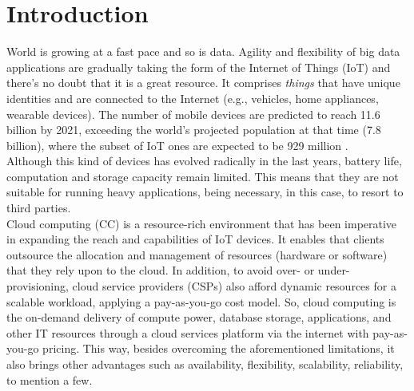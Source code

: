 \section{Introduction}\label{sec:Introduction}
\noindent
World is growing at a fast pace and so is data. Agility and flexibility of big data applications are gradually taking the form of the Internet of Things (IoT) and there’s no doubt that it is a great resource. It comprises \textit{things} that have unique identities and are connected to the Internet (e.g., vehicles, home appliances, wearable devices). The number of mobile devices are predicted to reach 11.6 billion by 2021, exceeding the world’s projected population at that time (7.8 billion), where the subset of IoT ones are expected to be 929 million \cite{CiscoVis16:online}.\\
\noindent\tab Although this kind of devices has evolved radically in the last years, battery life, computation and storage capacity remain limited. This means that they are not suitable for running heavy applications, being necessary, in this case, to resort to third parties.\\
\noindent\tab Cloud computing (CC) is a resource-rich environment that has been imperative in expanding the reach and capabilities of IoT devices. It enables that clients outsource the allocation and management of resources (hardware or software) that they rely upon to the cloud. In addition, to avoid over- or under-provisioning, cloud service providers (CSPs) also afford dynamic resources for a scalable workload, applying a pay-as-you-go cost model. So, cloud computing is the on-demand delivery of compute power, database storage, applications, and other IT resources through a cloud services platform via the internet with pay-as-you-go pricing. %
This way, besides overcoming the aforementioned limitations, it also brings other advantages such as availability, flexibility, scalability, reliability, to mention a few.\\
